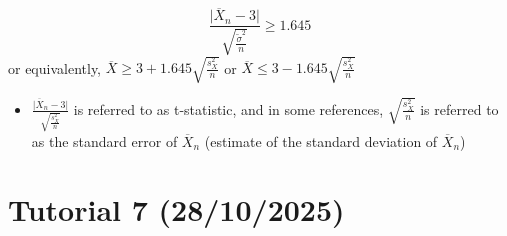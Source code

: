 \documentclass{article}
\begin{document}
\begin{itemize}
    \[
    \frac{\vert \overline{X}_n - 3 \vert }{\sqrt{\frac{\tilde{\sigma}^2}{n}}} \ge 1.645
    \]
    or equivalently, $\overline{X} \ge 3 + 1.645\sqrt{\frac{s_X^2}{n}}$ or  $\overline{X} \le 3 - 1.645\sqrt{\frac{s_X^2}{n}}$
    \begin{itemize}
        \item $\frac{\vert \overline{X}_n - 3 \vert }{\sqrt{\frac{s_X^2}{n}}}$ is referred to as t-statistic, and in some references, $\sqrt{\frac{s_X^2}{n}}$ is referred to as the standard error of $\overline{X}_n$ (estimate of the standard deviation of $\overline{X}_n$)
    \end{itemize}
\end{itemize}

\section{Tutorial 7 (28/10/2025)}
\end{document}
